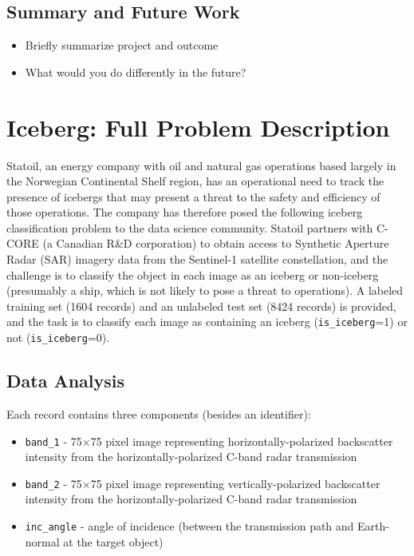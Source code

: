 \documentclass[fleqn,10pt]{SelfArx} %
\begin{document}
\subsection{Summary and Future Work}
\begin{itemize}[noitemsep]
\item Briefly summarize project and outcome
\item What would you do differently in the future?
\end{itemize}

\lipsum[10] %
\section{Iceberg: Full Problem Description}

Statoil, an energy company with oil and natural gas operations based largely in the Norwegian Continental Shelf region, has an operational need to track the presence of icebergs that may present a threat to the safety and efficiency of those operations. \cite{statoil} The company has therefore posed the following iceberg classification problem to the data science community.  Statoil partners with C-CORE (a Canadian R\&D corporation) to obtain access to Synthetic Aperture Radar (SAR) imagery data from the Sentinel-1 satellite constellation, and the challenge is to classify the object in each image as an iceberg or non-iceberg (presumably a ship, which is not likely to pose a threat to operations). A labeled training set (1604 records) and an unlabeled test set (8424 records) is provided, and the task is to classify each image as containing an iceberg (\texttt{is\_iceberg}=1) or not (\texttt{is\_iceberg}=0). \cite{kaggle-ice}

\subsection{Data Analysis}
Each record contains three components (besides an identifier):

\begin{itemize}
	\item \texttt{band\_1} - 75$\times$75 pixel image representing horizontally-polarized backscatter intensity from the horizontally-polarized C-band radar transmission
	\item \texttt{band\_2} - 75$\times$75 pixel image representing vertically-polarized backscatter intensity from the horizontally-polarized C-band radar transmission
	\item \texttt{inc\_angle} - angle of incidence (between the transmission path and Earth-normal at the target object)
\end{itemize}
\end{document}
